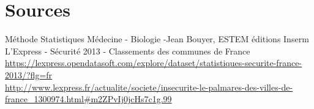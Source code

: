 \documentclass[11pt,a4paper]{article}
\begin{document}
			
		
					
				
					
				\section*{Sources} 
				M\'ethode Statistiques M\'edecine - Biologie -Jean Bouyer, ESTEM \'editions Inserm\\
				\newline
				L'Express - S\'ecurit\'e 2013 - Classements des communes de France\\
				\scriptsize{
		 \url{https://lexpress.opendatasoft.com/explore/dataset/statistiques-securite-france-2013/?flg=fr}\\
		\url{http://www.lexpress.fr/actualite/societe/insecurite-le-palmares-des-villes-de-france_1300974.html#m2ZPvIj0jcHs7c1g.99}}
		
				
\end{document}
